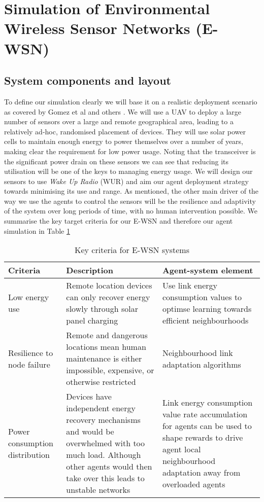 \section{Simulation of Environmental Wireless Sensor Networks (E-WSN)}
\label{section:experimental}	
	\subsection{System components and layout}
	
	To define our simulation clearly we will base it on a realistic deployment scenario as covered by Gomez et al \cite{Gomez} and others \cite{Jha2016, Avram}. We will use a UAV to deploy a large number of sensors over a large and remote geographical area, leading to a relatively ad-hoc, randomised placement of devices. They will use solar power cells to maintain enough energy to power themselves over a number of years, making clear the requirement for low power usage. Noting that the transceiver is the significant power drain on these sensors we can see that reducing its utilisation will be one of the keys to managing energy usage. We will design our sensors to use \textit{Wake Up Radio} (WUR) and aim our agent deployment strategy towards minimising its use and range. As mentioned, the other main driver of the way we use the agents to control the sensors will be the resilience and adaptivity of the system over long periods of time, with no human intervention possible.  We summarise the key target criteria for our E-WSN and therefore our agent simulation in Table \ref {table:real_world_systems_criteria} 
	\begin{table}
		\begin{tabular}{p{}p{} p{}}
			\hline
			\textbf{Criteria} & \textbf{Description} & \textbf{Agent-system element} \\
			\hline
			Low energy use & Remote location devices can only recover energy slowly through solar panel charging &  Use link energy consumption values to optimse learning towards efficient neighbourhoods \\
			Resilience to node failure & Remote and dangerous locations mean human maintenance is either impossible, expensive, or otherwise restricted & Neighbourhood link adaptation algorithms \\	
			Power consumption distribution & Devices have independent energy recovery mechanisms and would be overwhelmed with too much load. Although other agents would then take over this leads to unstable networks & Link energy consumption value rate accumulation for agents can be used to shape rewards to drive agent local neighbourhood adaptation away from overloaded agents  \\ 
			\hline
		\end{tabular}
		\caption{Key criteria for E-WSN systems}
		\label{table:real_world_systems_criteria}
	\end{table}
	

